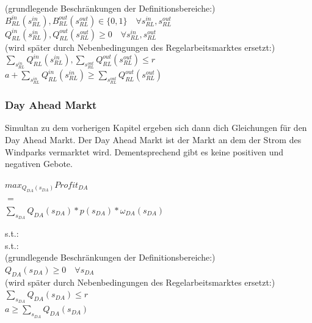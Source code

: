 \documentclass{article}
\begin{document}
(grundlegende Beschränkungen der Definitionsbereiche:)\\
$B^{in}_{RL}(s^{in}_{RL}),B^{out}_{RL}(s^{out}_{RL}) \in \{0,1\}\quad\forall s^{in}_{RL},s^{out}_{RL} $\\
$Q^{in}_{RL}(s^{in}_{RL}),Q^{out}_{RL}(s^{out}_{RL}) \geq 0\quad\forall  s^{in}_{RL},s^{out}_{RL} $\\
(wird später durch Nebenbedingungen des Regelarbeitsmarktes ersetzt:)\\
$\sum_{s^{in}_{RL}}Q^{in}_{RL}(s^{in}_{RL}),\sum_{s^{out}_{RL}}Q^{out}_{RL}(s^{out}_{RL}) \leq r $\\
$a + \sum_{s^{in}_{RL}}Q^{in}_{RL}(s^{in}_{RL})\geq \sum_{s^{out}_{RL}}Q^{out}_{RL}(s^{out}_{RL}) $\\

\subsubsection{Day Ahead Markt}
Simultan zu dem vorherigen Kapitel ergeben sich dann dich Gleichungen für den Day Ahead Markt.
Der Day Ahead Markt ist der Markt an dem der Strom des Windparks vermarktet wird. Dementsprechend gibt es keine positiven und negativen Gebote.

\begin{center}
$max_{Q_{DA}(s_{DA})} Profit_{DA}$\\ 
$=$\\
$\sum_{s_{DA}} Q_{DA}(s_{DA}) * p(s_{DA}) * \omega_{DA}(s_{DA})$\\

\end{center}
s.t.:\\

s.t.:\\
(grundlegende Beschränkungen der Definitionsbereiche:)\\
$Q_{DA}(s_{DA}) \geq 0\quad\forall  s_{DA} $\\
(wird später durch Nebenbedingungen des Regelarbeitsmarktes ersetzt:)\\

$ \sum_{s_{DA}}Q_{DA}(s_{DA}) \leq r $\\
$a \geq \sum_{s_{DA}}Q_{DA}(s_{DA}) $\\
\end{document}
